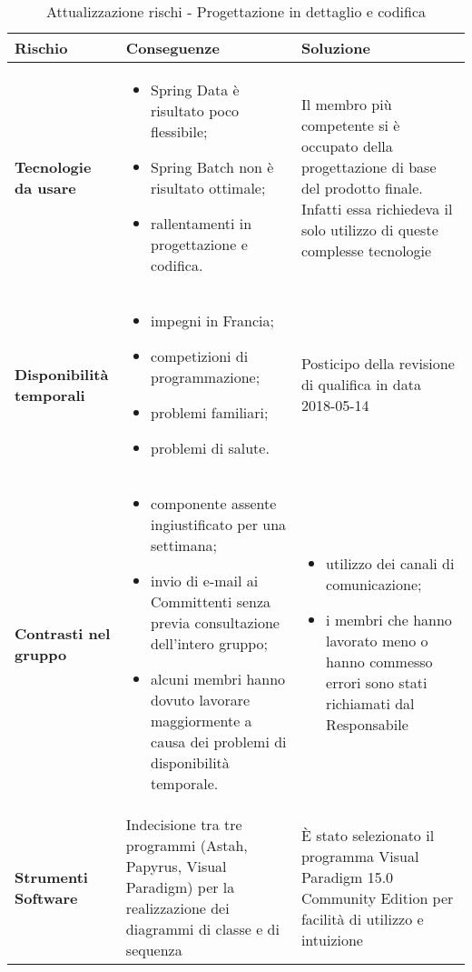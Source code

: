 \begin{table}[H]
	\centering
	\begin{tabular}{| p{3cm} | p{6cm} | p{6cm}|}
		\hline
		\textbf{Rischio} & \textbf{Conseguenze} & \textbf{Soluzione} \\
		\hline
		\textbf{Tecnologie da usare} & \begin{itemize}
											\item Spring Data è risultato poco flessibile;
											\item Spring Batch non è risultato ottimale;
											\item rallentamenti in progettazione e codifica.
										\end{itemize} & Il membro più competente si è occupato della progettazione di base del prodotto finale. Infatti essa richiedeva il solo utilizzo di queste complesse tecnologie \\ \hline
		\textbf{Disponibilità temporali} & \begin{itemize}
												\item impegni in Francia;
												\item competizioni di programmazione;
												\item problemi familiari;
												\item problemi di salute.
											\end{itemize} & Posticipo della revisione di qualifica in data 2018-05-14		 \\ \hline
		\textbf{Contrasti nel gruppo} & \begin{itemize}
											\item componente assente ingiustificato per una settimana;
											\item invio di e-mail ai Committenti senza previa consultazione dell'intero gruppo;
											\item alcuni membri hanno dovuto lavorare maggiormente a causa dei problemi di disponibilità temporale.
										\end{itemize} & \begin{itemize}
															\item utilizzo dei canali di comunicazione;
															\item i membri che hanno lavorato meno o hanno commesso errori sono stati richiamati dal Responsabile
														\end{itemize}												 \\ \hline
		\textbf{Strumenti Software} & Indecisione tra tre programmi (Astah, Papyrus, Visual Paradigm) per la realizzazione dei diagrammi di classe e di sequenza & È stato selezionato il programma Visual Paradigm 15.0 Community Edition per facilità di utilizzo e intuizione \\
		\hline
	\end{tabular}
	\caption[Attualizzazione rischi - Progettazione in dettaglio e codifica]{Attualizzazione rischi - Progettazione in dettaglio e codifica}
\end{table}
\newpage

